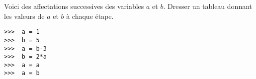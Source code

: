 Voici des affectations successives des variables $a$ et $b$. Dresser un tableau donnant les valeurs 
de $a$ et $b$ à chaque étape.

\begin{lstlisting}
>>>  a = 1
>>>  b = 5
>>>  a = b-3 
>>>  b = 2*a 	
>>>  a = a
>>>  a = b	
\end{lstlisting}